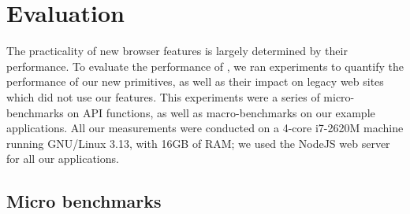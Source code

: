 \section{Evaluation}
\label{sec:eval}

The practicality of new browser features is largely determined
by their performance.
%
To evaluate the performance of \sys{}, we ran experiments to
quantify the performance of our new primitives, as well as their
impact on legacy web sites which did not use our features.
%
This experiments were a series of micro-benchmarks on API functions,
as well as macro-benchmarks on our example applications.
%
All our measurements were conducted on a 4-core i7-2620M machine
running GNU/Linux 3.13, with 16GB of RAM\@; we used the NodeJS web
server for all our applications.

\subsection{Micro benchmarks}
\label{sec:eval:micro}

\newcommand*\rot{\rotatebox{90}}

